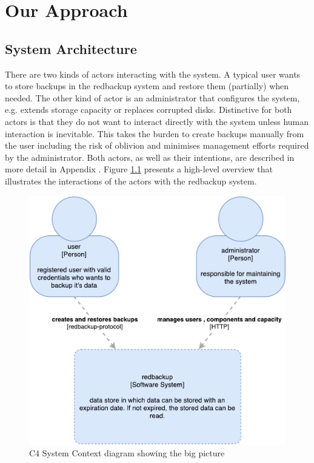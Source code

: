 \chapter{Our Approach}
\label{sec:our-approach}

\section{System Architecture}

There are two kinds of actors interacting with the system. A typical \gls{user} wants to store backups in the redbackup system and restore them (partially) when needed. The other kind of actor is an \gls{administrator} that configures the system, e.g. extends storage capacity or replaces corrupted disks. Distinctive for both actors is that they do not want to interact directly with the system unless human interaction is inevitable. This takes the burden to create backups manually from the user including the risk of oblivion and minimises management efforts required by the administrator.  Both actors, as well as their intentions, are described in more detail in Appendix . Figure \ref{fig:c4-overview} presents a high-level overview that illustrates the interactions of the actors with the redbackup system.

\begin{figure}[h]
	\centering
	\includegraphics[width=0.5\linewidth]{resources/c4-overview}
	\caption[C4 System Context diagram]{C4 System Context diagram showing the big picture}
	\label{fig:c4-overview}
\end{figure}

